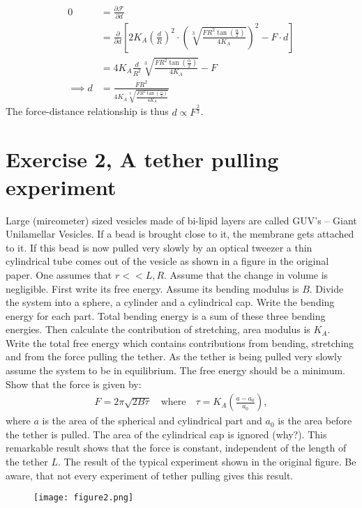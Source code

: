 \documentclass[a4paper]{article}
\newcommand{\F}{\mathcal{F}}
\begin{document}
\begin{align*}
    0 &= \frac{\partial \F}{\partial d}\\
    &= \frac{\partial}{\partial d}\left[2K_A\left(\frac{d}{R}\right)^2\cdot \left(\sqrt[3]{\frac{FR^2\tan{\left(\frac{\alpha}{2}\right)}}{4K_A}}\right)^2 - F\cdot d\right]\\
    &= 4K_A\frac{d}{R^2}\sqrt[3]{\frac{FR^2\tan{\left(\frac{\alpha}{2}\right)}}{4K_A}} - F\\
    \implies d &=  \frac{FR^2}{4K_A\sqrt[3]{\frac{FR^2\tan{\left(\frac{\alpha}{2}\right)}}{4K_A}}}
\end{align*}The force-distance relationship is thus $d \propto F^{\frac{2}{3}}$.




\section*{Exercise 2, A tether pulling experiment}
Large (mircometer) sized vesicles made of bi-lipid layers are called GUV's -- Giant Unilamellar Vesicles. If a bead is brought close to it, the membrane gets attached to it.
If this bead is now pulled very slowly by an optical tweezer a thin cylindrical tube comes out of the vesicle as shown in a figure in the original paper. One assumes that $r<< L, R$.
Assume that the change in volume is negligible. First write its free energy. Assume its bending modulus is $B$. Divide the system into a sphere, a cylinder and a cylindrical cap. 
Write the bending energy for each part. Total bending energy is a sum of these three bending energies. Then calculate the contribution of stretching, area modulus is $K_A$.
Write the total free energy which contains contributions from bending, stretching and from the force pulling the tether.
As the tether is being pulled very slowly assume the system to be in equilibrium. The free energy should be a minimum. Show that the force is given by:
\begin{align*}
    F = 2\pi\sqrt{2B \tau}\quad \text{where} \quad \tau = K_A \left(\frac{a - a_0}{a_0}\right),
\end{align*}where $a$ is the area of the spherical and cylindrical part and $a_0$ is the area before the tether is pulled. The area of the cylindrical cap is ignored (why?). 
This remarkable result shows that the force is constant, independent of the length of the tether $L$. The result of the typical experiment shown in the original figure.
Be aware, that not every experiment of tether pulling gives this result.
\begin{figure}[H]
    \centering
    \texttt{[image: figure2.png]}
\end{figure}
\end{document}

